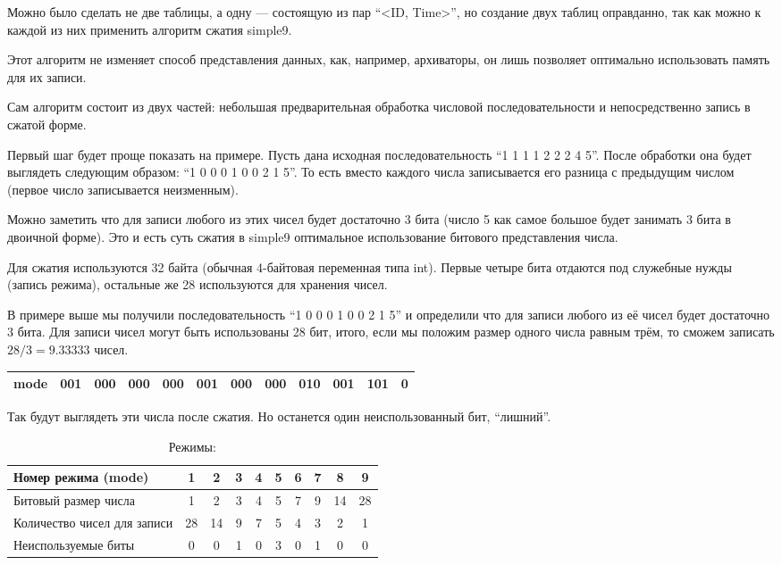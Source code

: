 \documentclass[12pt]{article}
\begin{document}
Можно было сделать не две таблицы, а одну --- состоящую из пар ``<ID, Time>'', но создание
двух таблиц оправданно, так как можно к каждой из них применить алгоритм сжатия simple9.

Этот алгоритм не изменяет способ представления данных, как, например, архиваторы, он лишь
позволяет оптимально использовать память для их записи.

Сам алгоритм состоит из двух частей: небольшая предварительная обработка числовой последовательности и
непосредственно запись в сжатой форме.

Первый шаг будет проще показать на примере. Пусть дана исходная последовательность
``1	1	1	1	2	2	2	4	5''. После обработки она
будет выглядеть следующим образом: ``1 0 0 0 1 0 0 2 1 5''. То есть вместо
каждого числа записывается его разница с предыдущим числом (первое число записывается неизменным).

Можно заметить что для записи любого из этих чисел будет достаточно 3 бита (число 5
как самое большое будет занимать 3 бита в двоичной форме). Это и есть суть сжатия в
simple9 оптимальное использование битового представления числа.

Для сжатия используются 32 байта (обычная 4-байтовая переменная типа int). Первые четыре
бита отдаются под служебные нужды (запись режима), остальные же 28 используются для
хранения чисел.

В примере выше мы получили последовательность ``1 0 0 0 1 0 0 2 1 5'' и
определили что для записи любого из её чисел будет достаточно 3 бита. Для записи чисел
могут быть использованы 28 бит, итого, если мы положим размер одного числа равным трём,
то сможем записать $28/3 = 9.33333$ чисел.
\begin{table}[ht]
	\begin{tabular}{|l|l|l|l|l|l|l|l|l|l|l|l|}
		\hline
		mode & 001 & 000 & 000 & 000 & 001 & 000 & 000 & 010 & 001 & 101 & 0 \\
		\hline
	\end{tabular}
\end{table}

Так будут выглядеть эти числа после сжатия. Но останется один неиспользованный бит,
``лишний''.


\begin{table}[ht]
	\caption*{Режимы:}
	\begin{tabular}{|l|c|c|c|c|c|c|c|c|c|}
		\hline
		Номер режима (mode)         & 1  & 2  & 3 & 4 & 5 & 6 & 7 & 8  & 9  \\ \hline
		Битовый размер числа        & 1  & 2  & 3 & 4 & 5 & 7 & 9 & 14 & 28 \\ \hline
		Количество чисел для записи & 28 & 14 & 9 & 7 & 5 & 4 & 3 & 2  & 1  \\ \hline
		Неиспользуемые биты         & 0  & 0  & 1 & 0 & 3 & 0 & 1 & 0  & 0  \\ \hline
	\end{tabular}
\end{table}
\end{document}
